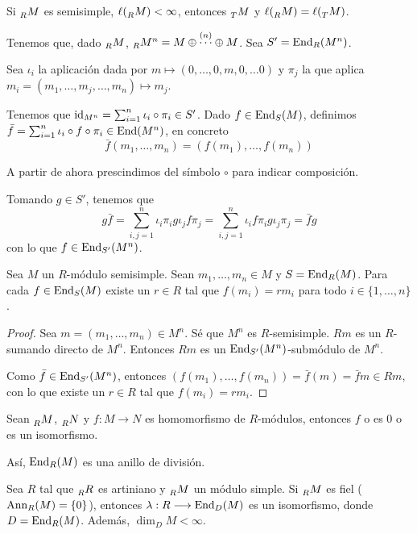 
\begin{cor}
  Si \(\prescript{}{R}{M}\) es semisimple,
  \(\ell(\prescript{}{R}{M})<\infty\), entonces \(\prescript{}{T}{M}\)
  y \(\ell(\prescript{}{R}{M})=\ell(\prescript{}{T}{M})\).
\end{cor}

Tenemos que, dado \(\prescript{}{R}{M}\),
\(\prescript{}{R}{M}^n=M\oplus\overset{(n)}{\cdots}\oplus M\).
Sea \(S'=\operatorname{End}_R(M^n)\).

Sea \(\iota_i\) la aplicación dada por \(m\mapsto(0,\ldots,0,m,0,\ldots0)\) y
\(\pi_j\) la que aplica \(m_i=(m_1,\ldots, m_j,\ldots, m_n)\mapsto m_j\).

Tenemos que \(\operatorname{id}_{M^n}=\sum_{i=1}^n\iota_i\circ\pi_i\in S'\).
Dado \(f\in\operatorname{End}_S(M)\), definimos \(\bar{f}=\sum_{i=1}^n\iota_i\circ
f\circ\pi_i\in\operatorname{End}(M^n)\), en concreto
\[
  \bar{f}(m_1,\ldots, m_n)=(f(m_1),\ldots,f(m_n))
\]

A partir de ahora prescindimos del símbolo \(\circ\) para indicar composición.

Tomando \(g\in S'\), tenemos que
\[
  g\bar{f}=\sum_{i,j=1}^n \iota_i\pi_i g \iota_j f\pi_j
  =\sum_{i,j=1}^n \iota_i f\pi_i g\iota_j\pi_j=\bar{f}g
\]
con lo que \(f\in \operatorname{End}_{S'}(M^n)\).

\begin{teo}
  Sea \(M\) un \(R\)-módulo semisimple. Sean \(m_1,\ldots, m_n\in M\)
  y \(S=\operatorname{End}_R(M)\). Para cada \(f\in\operatorname{End}_S(M)\) existe un \(r\in R\)
  tal que \(f(m_i)=rm_i\) para todo \(i\in\{1,\ldots,n\}\).
\end{teo}
\begin{proof}
  Sea \(m=(m_1,\ldots, m_n)\in M^n\). Sé que \(M^n\) es \(R\)-semisimple.
  \(
    Rm
  \) es un \(R\)-sumando directo de \(M^n\). Entonces \(Rm\) es un
  \(\operatorname{End}_{S'}(M^n)\)-submódulo de \(M^n\).

  Como \(\bar{f}\in\operatorname{End}_{S'}(M^n)\), entonces
  \((f(m_1),\ldots,f(m_n))=\bar{f}(m)=\bar{f} m\in Rm\), con lo que
  existe un \(r\in R\) tal que \(f(m_i)=rm_i\).

\end{proof}

\begin{lema}[de Schur]
  Sean \(\prescript{}{R}{M}\), \(\prescript{}{R}{N}\) y
  \(f:M\longrightarrow N\) es homomorfismo de \(R\)-módulos,
  entonces \(f\) o es 0 o es un isomorfismo.

  Así, \(\operatorname{End}_R(M)\) es una anillo de división.
\end{lema}

\begin{prop}
  Sea \(R\) tal que \(\prescript{}{R}{R}\) es artiniano y
  \(\prescript{}{R}{M}\) un módulo simple. Si \(\prescript{}{R}{M}\)
  es fiel (\(\operatorname{Ann}_R(M)=\{0\}\)),
  entonces \(\lambda:R\longrightarrow\operatorname{End}_D(M)\) es un isomorfismo, donde
  \(D=\operatorname{End}_R(M)\).
  Además, \(\dim_D M<\infty\).
\end{prop}

